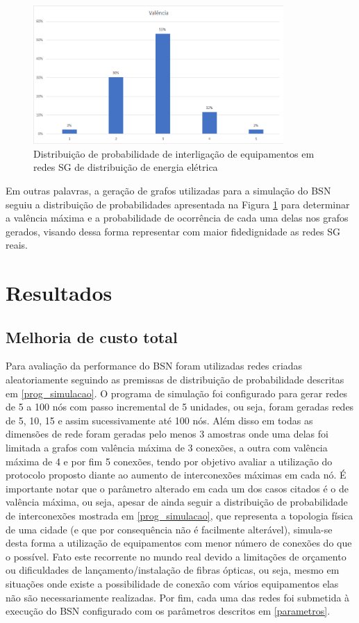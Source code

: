 \begin{figure} [ht]%
	\centering
	\includegraphics[width=0.85\textwidth]{./figuras/Distribuicao-prob.png}
	\caption[Distribuição de probabilidade]{Distribuição de probabilidade de interligação de equipamentos em redes SG de distribuição de energia elétrica}
	\label{fig_dist_prob}
\end{figure}

Em outras palavras, a geração de grafos utilizadas para a simulação do BSN seguiu a distribuição de probabilidades apresentada na Figura \ref{fig_dist_prob} para determinar a valência máxima e a probabilidade de ocorrência de cada uma delas nos grafos gerados, visando dessa forma representar com maior fidedignidade as redes SG reais.

\section{Resultados}
\label{resultados}
\subsection{Melhoria de custo total}
Para avaliação da performance do BSN foram utilizadas redes criadas aleatoriamente seguindo as premissas de distribuição de probabilidade descritas em \ref{prog_simulacao}. O programa de simulação foi configurado para gerar redes de 5 a 100 nós com passo incremental de 5 unidades, ou seja, foram geradas redes de 5, 10, 15 e assim sucessivamente até 100 nós. Além disso em todas as dimensões de rede foram geradas pelo menos 3 amostras onde uma delas foi limitada a grafos com valência máxima de 3 conexões, a outra com valência máxima de 4 e por fim 5 conexões, tendo por objetivo avaliar a utilização do protocolo proposto diante ao aumento de interconexões máximas em cada nó. É importante notar que o parâmetro alterado em cada um dos casos citados é o de valência máxima, ou seja, apesar de ainda seguir a distribuição de probabilidade de interconexões mostrada em \ref{prog_simulacao}, que representa a topologia física de uma cidade (e que por consequência não é facilmente alterável), simula-se desta forma a utilização de equipamentos com menor número de conexões do que o possível. Fato este recorrente no mundo real devido a limitações de orçamento ou dificuldades de lançamento/instalação de fibras ópticas, ou seja, mesmo em situações onde existe a possibilidade de conexão com vários equipamentos elas não são necessariamente realizadas. Por fim, cada uma das redes foi submetida à execução do BSN configurado com os parâmetros descritos em \ref{parametros}.

